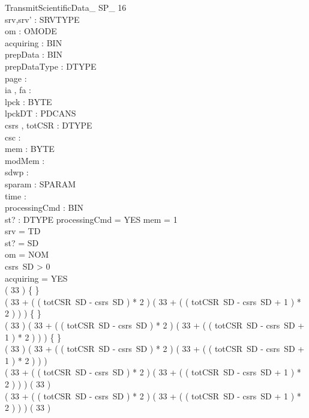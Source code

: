 \begin{schema}{TransmitScientificData\_ SP\_ 16}\\
 srv,srv' : SRVTYPE \\
 om : OMODE \\
 acquiring : BIN \\
 prepData : BIN \\
 prepDataType : DTYPE \\
 page : \nat \\
 ia , fa : \nat \\
 lpck : \seq BYTE \\
 lpckDT : PDCANS \\
 csrs , totCSR : DTYPE \fun \nat \\
 csc : \nat \\
 mem : \nat \pfun BYTE \\
 modMem : \power \nat \\
 sdwp : \nat \\
 sparam : SPARAM \fun \nat \\
 time : \nat \\
 processingCmd : BIN \\
 st? : DTYPE 
\where
 processingCmd = YES \land \dom mem = 1  \\
 srv = TD \\
 st? = SD \\
 om = NOM \\
 csrs~SD > 0 \\
 acquiring = YES \\
 ( 33  ) \neq \{ \} \\
 ( 33 + ( ( totCSR~SD - csrs~SD ) * 2 ) \upto ( 33 + ( ( totCSR~SD - csrs~SD + 1 ) * 2 ) ) ) \neq \{ \} \\
 ( 33  ) \cap ( 33 + ( ( totCSR~SD - csrs~SD ) * 2 ) \upto ( 33 + ( ( totCSR~SD - csrs~SD + 1 ) * 2 ) ) ) \neq \{ \} \\
 \lnot ( 33  ) \subseteq ( 33 + ( ( totCSR~SD - csrs~SD ) * 2 ) \upto ( 33 + ( ( totCSR~SD - csrs~SD + 1 ) * 2 ) ) ) \\
 \lnot ( 33 + ( ( totCSR~SD - csrs~SD ) * 2 ) \upto ( 33 + ( ( totCSR~SD - csrs~SD + 1 ) * 2 ) ) ) \subseteq ( 33  ) \\
 ( 33 + ( ( totCSR~SD - csrs~SD ) * 2 ) \upto ( 33 + ( ( totCSR~SD - csrs~SD + 1 ) * 2 ) ) ) \neq ( 33  )
\end{schema}

